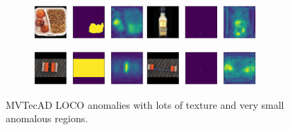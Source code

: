 \begin{figure}[htbp]
    \centering
    \begin{subfigure}[b]{\textwidth}
        \includegraphics[width=0.45\textwidth]{figures/difficultAnomalies/breakfast_box_test_logical_anomalies_011.png}
        \includegraphics[width=0.45\textwidth]{figures/difficultAnomalies/juice_bottle_test_structural_anomalies_059.png}

    \end{subfigure}
    \begin{subfigure}[b]{\textwidth}
        \includegraphics[width=0.45\textwidth]{figures/difficultAnomalies/splicing_connectors_test_logical_anomalies_064.png}
        \includegraphics[width=0.45\textwidth]{figures/difficultAnomalies/splicing_connectors_test_structural_anomalies_001.png}

    \end{subfigure}
    \caption{MVTecAD LOCO \cite{LOCODentsAndScratchesBergmann2022} anomalies with lots of texture and very small anomalous regions.}
    \label{fig:difficultAnomalies}
\end{figure}